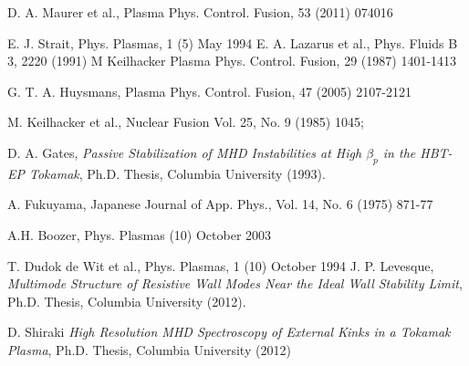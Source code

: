\documentclass[aps,preprint,showpacs,superscriptaddress,groupedaddress]{revtex4}  %
\begin{document}
\begin{thebibliography}{99}
 D. A. Maurer et al., Plasma Phys. Control. Fusion, 53 (2011) 074016

 E. J. Strait, Phys. Plasmas, 1 (5) May 1994
 E. A. Lazarus et al., Phys. Fluids B 3, 2220 (1991)
 M Keilhacker Plasma Phys. Control. Fusion, 29 (1987) 1401-1413

 G. T. A. Huysmans, Plasma Phys. Control. Fusion, 47 (2005) 2107-2121 

 M. Keilhacker et al., Nuclear Fusion Vol. 25, No. 9 (1985) 1045;

 D. A. Gates, \emph{Passive Stabilization of MHD Instabilities at High ${\beta_p}$ in the HBT-EP Tokamak}, Ph.D. Thesis, Columbia University (1993).

 A. Fukuyama, Japanese Journal of App. Phys., Vol. 14, No. 6 (1975) 871-77 

 A.H. Boozer, Phys. Plasmas (10) October 2003


 T. Dudok de Wit et al., Phys. Plasmas, 1 (10) October 1994
 J. P. Levesque, \emph{Multimode Structure of Resistive Wall Modes Near the Ideal Wall Stability Limit}, Ph.D. Thesis, Columbia University (2012).

 D. Shiraki \emph{High Resolution MHD Spectroscopy of External Kinks in a Tokamak Plasma}, Ph.D. Thesis, Columbia University (2012)

\end{thebibliography}
\end{document}
